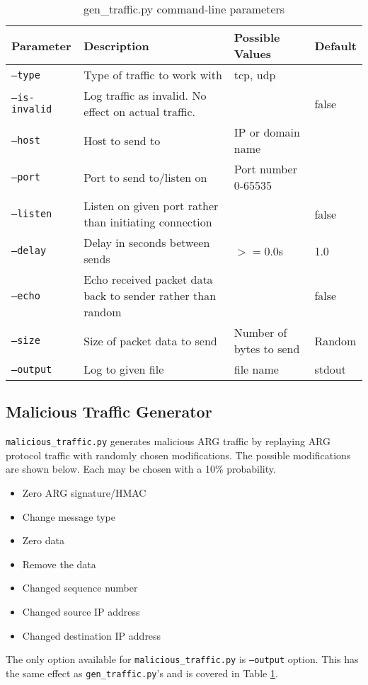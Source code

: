 \begin{table}
\caption{gen\_traffic.py command-line parameters}
\label{tbl:gen_traffic_param}
\centering
\begin{tabular}{l|p{2in}|l|l}
Parameter & Description & Possible Values & Default\\
\hline
\texttt{--type} & Type of traffic to work with & tcp, udp & \\
\texttt{--is-invalid} & Log traffic as invalid. No effect on actual traffic. & & false\\
\texttt{--host} & Host to send to & \ac{IP} or domain name & \\
\texttt{--port} & Port to send to/listen on & Port number 0-65535 & \\
\texttt{--listen} & Listen on given port rather than initiating connection & & false\\
\texttt{--delay} & Delay in seconds between sends & $>=$0.0s & 1.0\\
\texttt{--echo} & Echo received packet data back to sender rather than random & & false\\
\texttt{--size} & Size of packet data to send & Number of bytes to send & Random\\
\texttt{--output} & Log to given file & file name & stdout
\end{tabular}
\end{table}

\subsection{Malicious Traffic Generator}
\par \texttt{malicious\_traffic.py} generates malicious ARG traffic by replaying \ac{ARG} protocol traffic with randomly chosen modifications. The possible modifications are shown below. Each may be chosen with a 10\% probability.
{\singlespace
\begin{itemize}
\item Zero \ac{ARG} signature/\ac{HMAC}
\item Change message type
\item Zero data
\item Remove the data
\item Changed sequence number
\item Changed source \ac{IP} address
\item Changed destination \ac{IP} address
\end{itemize}
}

\par The only option available for \texttt{malicious\_traffic.py} is \texttt{--output} option. This has the same effect as \texttt{gen\_traffic.py}'s and is covered in Table \ref{tbl:gen_traffic_param}.

